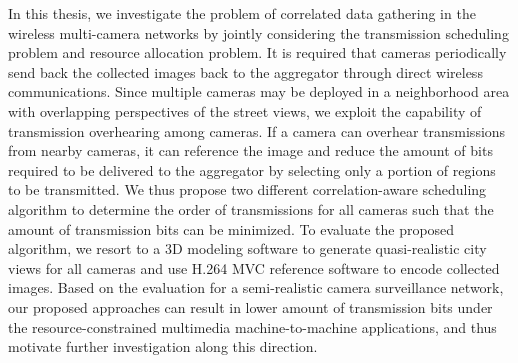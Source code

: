 In this thesis, we investigate the problem of correlated data gathering in the wireless multi-camera networks by jointly considering the transmission scheduling problem and resource allocation problem.
It is required that cameras periodically send back the collected images back to the aggregator through direct wireless communications.
Since multiple cameras may be deployed in a neighborhood area with overlapping perspectives of the street views, we exploit the capability of transmission overhearing among cameras.
If a camera can overhear transmissions from nearby cameras, it can reference the image and reduce the amount of bits required to be delivered to the aggregator by selecting only a portion of regions to be transmitted.
We thus propose two different correlation-aware scheduling algorithm to determine the order of transmissions for all cameras such that the amount of transmission bits can be minimized.
To evaluate the proposed algorithm, we resort to a 3D modeling software to generate quasi-realistic city views for all cameras and use H.264 MVC reference software to encode collected images.
Based on the evaluation for a semi-realistic camera surveillance network, our proposed approaches can result in lower amount of transmission bits under the resource-constrained multimedia machine-to-machine applications, and thus motivate further investigation along this direction.